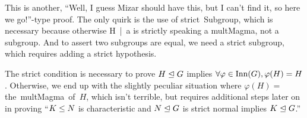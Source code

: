 \begin{thm-remark}
This is another, ``Well, I guess Mizar should have this, but I can't
find it, so here we go!''-type proof. The only quirk is the use of
{\Tt{}strict\ Subgroup\nwendquote}, which is necessary because otherwise {\Tt{}H\ |{}\ a\nwendquote} is
strictly speaking a {\Tt{}multMagma\nwendquote}, not a subgroup. And to assert two
subgroups are equal, we need a {\Tt{}strict\nwendquote} subgroup, which requires
adding a {\Tt{}strict\nwendquote} hypothesis.
\end{thm-remark}

\begin{thm-remark}
The {\Tt{}strict\nwendquote} condition is necessary to prove $H\trianglelefteq G$
implies $\forall\varphi\in\operatorname{Inn}(G),\varphi(H)=H$. Otherwise, we end up
with the slightly peculiar situation where $\varphi(H) = $
{\Tt{}the\ multMagma\ of\ \nwendquote}$H$, which isn't terrible, but requires additional
steps later on in proving ``$K\leq N$ is characteristic and
$N\trianglelefteq G$ is {\Tt{}strict\nwendquote} normal implies $K\trianglelefteq G$.''
\end{thm-remark}

